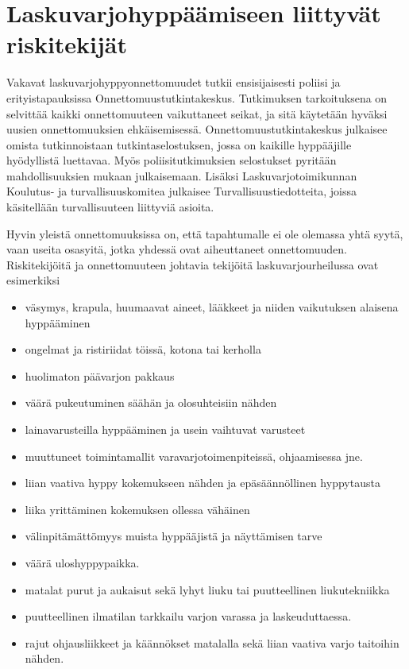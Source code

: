 \section{ Laskuvarjohyppäämiseen liittyvät riskitekijät }
\label{riskitekijat-toiminta-onnettomuustilanteessa-ja-ensiapu-laskuvarjohyppaamiseen-liittyvat-riskitekijat}


Vakavat laskuvarjohyppyonnettomuudet tutkii ensisijaisesti poliisi ja erityistapauksissa Onnettomuustutkintakeskus. Tutkimuksen tarkoituksena on selvittää kaikki onnettomuuteen vaikuttaneet seikat, ja sitä käytetään hyväksi uusien onnettomuuksien ehkäisemisessä. Onnettomuustutkintakeskus julkaisee omista tutkinnoistaan tutkintaselostuksen, jossa on kaikille hyppääjille hyödyllistä luettavaa. Myös poliisitutkimuksien selostukset pyritään mahdollisuuksien mukaan julkaisemaan. Lisäksi Laskuvarjotoimikunnan Koulutus- ja turvallisuuskomitea julkaisee Turvallisuustiedotteita, joissa käsitellään turvallisuuteen liittyviä asioita. 


Hyvin yleistä onnettomuuksissa on, että tapahtumalle ei ole olemassa yhtä syytä, vaan useita osasyitä, jotka yhdessä ovat aiheuttaneet onnettomuuden. Riskitekijöitä ja onnettomuuteen johtavia tekijöitä laskuvarjourheilussa ovat esimerkiksi 

\begin{itemize}
\item  väsymys, krapula, huumaavat aineet, lääkkeet ja niiden vaikutuksen alaisena hyppääminen 
\item  ongelmat ja ristiriidat töissä, kotona tai kerholla 
\item  huolimaton päävarjon pakkaus 
\item  väärä pukeutuminen säähän ja olosuhteisiin nähden 
\item  lainavarusteilla hyppääminen ja usein vaihtuvat varusteet 
\item  muuttuneet toimintamallit varavarjotoimenpiteissä, ohjaamisessa jne. 
\item  liian vaativa hyppy kokemukseen nähden ja epäsäännöllinen hyppytausta 
\item  liika yrittäminen kokemuksen ollessa vähäinen 
\item  välinpitämättömyys muista hyppääjistä ja näyttämisen tarve 
\item  väärä uloshyppypaikka. 
\item  matalat purut ja aukaisut sekä lyhyt liuku tai puutteellinen liukutekniikka 
\item  puutteellinen ilmatilan tarkkailu varjon varassa ja laskeuduttaessa. 
\item  rajut ohjausliikkeet ja käännökset matalalla sekä liian vaativa varjo taitoihin nähden. 
\end{itemize}

